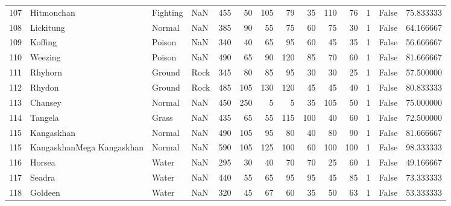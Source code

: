 \begin{tabular}{rlllrrrrrrrrlr}
 107 &                 Hitmonchan &  Fighting &       NaN &    455 &   50 &     105 &       79 &       35 &      110 &     76 &           1 &      False &   75.833333 \\
 108 &                  Lickitung &    Normal &       NaN &    385 &   90 &      55 &       75 &       60 &       75 &     30 &           1 &      False &   64.166667 \\
 109 &                    Koffing &    Poison &       NaN &    340 &   40 &      65 &       95 &       60 &       45 &     35 &           1 &      False &   56.666667 \\
 110 &                    Weezing &    Poison &       NaN &    490 &   65 &      90 &      120 &       85 &       70 &     60 &           1 &      False &   81.666667 \\
 111 &                    Rhyhorn &    Ground &      Rock &    345 &   80 &      85 &       95 &       30 &       30 &     25 &           1 &      False &   57.500000 \\
 112 &                     Rhydon &    Ground &      Rock &    485 &  105 &     130 &      120 &       45 &       45 &     40 &           1 &      False &   80.833333 \\
 113 &                    Chansey &    Normal &       NaN &    450 &  250 &       5 &        5 &       35 &      105 &     50 &           1 &      False &   75.000000 \\
 114 &                    Tangela &     Grass &       NaN &    435 &   65 &      55 &      115 &      100 &       40 &     60 &           1 &      False &   72.500000 \\
 115 &                 Kangaskhan &    Normal &       NaN &    490 &  105 &      95 &       80 &       40 &       80 &     90 &           1 &      False &   81.666667 \\
 115 &  KangaskhanMega Kangaskhan &    Normal &       NaN &    590 &  105 &     125 &      100 &       60 &      100 &    100 &           1 &      False &   98.333333 \\
 116 &                     Horsea &     Water &       NaN &    295 &   30 &      40 &       70 &       70 &       25 &     60 &           1 &      False &   49.166667 \\
 117 &                     Seadra &     Water &       NaN &    440 &   55 &      65 &       95 &       95 &       45 &     85 &           1 &      False &   73.333333 \\
 118 &                    Goldeen &     Water &       NaN &    320 &   45 &      67 &       60 &       35 &       50 &     63 &           1 &      False &   53.333333 \\

\end{tabular}
